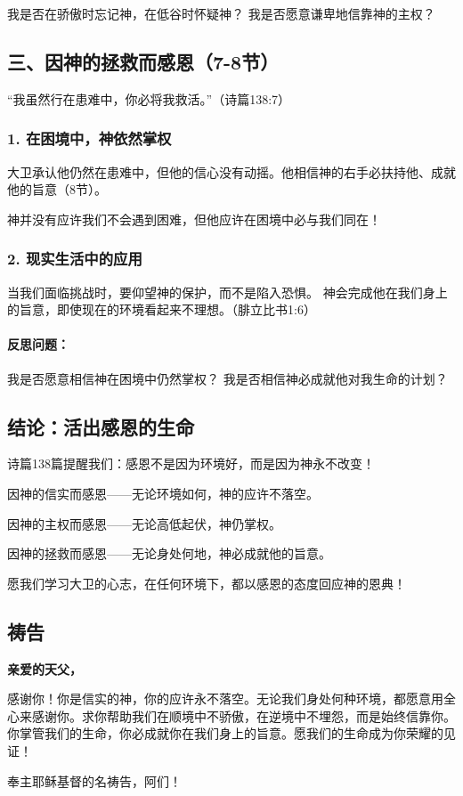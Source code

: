 \documentclass[a4paper, 12pt]{article}
\begin{document}
我是否在骄傲时忘记神，在低谷时怀疑神？
我是否愿意谦卑地信靠神的主权？
\subsection*{三、因神的拯救而感恩（7-8节）}
“我虽然行在患难中，你必将我救活。”（诗篇138:7）

\subsubsection*{1. 在困境中，神依然掌权}
大卫承认他仍然在患难中，但他的信心没有动摇。他相信神的右手必扶持他、成就他的旨意（8节）。

神并没有应许我们不会遇到困难，但他应许在困境中必与我们同在！

\subsubsection*{2. 现实生活中的应用}
当我们面临挑战时，要仰望神的保护，而不是陷入恐惧。
神会完成他在我们身上的旨意，即使现在的环境看起来不理想。（腓立比书1:6）
\paragraph*{反思问题：}

我是否愿意相信神在困境中仍然掌权？
我是否相信神必成就他对我生命的计划？
\subsection*{结论：活出感恩的生命}
诗篇138篇提醒我们：感恩不是因为环境好，而是因为神永不改变！

因神的信实而感恩——无论环境如何，神的应许不落空。

因神的主权而感恩——无论高低起伏，神仍掌权。

因神的拯救而感恩——无论身处何地，神必成就他的旨意。

愿我们学习大卫的心志，在任何环境下，都以感恩的态度回应神的恩典！

\subsection*{祷告}
\textbf{亲爱的天父，}

感谢你！你是信实的神，你的应许永不落空。无论我们身处何种环境，都愿意用全心来感谢你。求你帮助我们在顺境中不骄傲，在逆境中不埋怨，而是始终信靠你。你掌管我们的生命，你必成就你在我们身上的旨意。愿我们的生命成为你荣耀的见证！

奉主耶稣基督的名祷告，阿们！
\newpage
\end{document}
